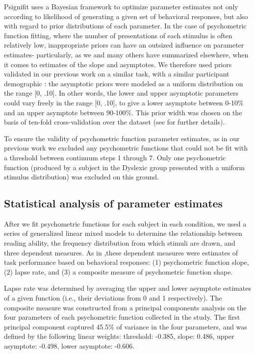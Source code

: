 \documentclass[../uwthesis.tex]{subfiles}
\begin{document}
Psignifit uses a Bayesian framework to optimize parameter estimates not only according to likelihood of generating a given set of behavioral responses, but also with regard to prior distributions of each parameter. In the case of psychometric function fitting, where the number of presentations of each stimulus is often relatively low, inappropriate priors can have an outsized influence on parameter estimates- particularly, as we and many others have summarized elsewhere, when it comes to estimates of the slope and asymptotes. We therefore used priors validated in our previous work on a similar task, with a similar participant demographic \citep{OBrien2019CategoricalDuration}: the asymptotic priors were modeled as a uniform distribution on the range [0, .10]. In other words, the lower and upper asymptotic parameters could vary freely in the range [0, .10], to give a lower asymptote between 0-10\% and an upper asymptote between 90-100\%. This prior width was chosen on the basis of ten-fold cross-validation over the dataset (see \citep{OBrien2018,OBrien2019CategoricalDuration} for further details). 

To ensure the validity of psychometric function parameter estimates, as in our previous work \citep{OBrien2018,OBrien2019CategoricalDuration} we excluded any psychometric functions that could not be fit with a threshold between continuum steps 1 through 7. Only one psychometric function (produced by a subject in the Dyslexic group presented with a uniform stimulus distribution) was excluded on this ground. 


\subsection{Statistical analysis of parameter estimates}
After we fit psychometric functions for each subject in each condition, we used a series of generalized linear mixed models to determine the relationship between reading ability, the frequency distribution from which stimuli are drawn, and three dependent measures. As in \citep{OBrien2018,OBrien2019CategoricalDuration},these dependent measures were estimates of task performance based on behavioral responses: (1) psychometric function slope, (2) lapse rate, and (3) a composite measure of psychometric function shape. 

Lapse rate was determined by averaging the upper and lower asymptote estimates of a given function (i.e., their deviations from 0 and 1 respectively). The composite measure was constructed from a principal components analysis on the four parameters of each psychometric function collected in the study. The first principal component captured 45.5\% of variance in the four parameters, and was defined by the following linear weights: threshold: -0.385, slope: 0.486, upper asymptote: -0.498, lower asymptote: -0.606. 
\end{document}
